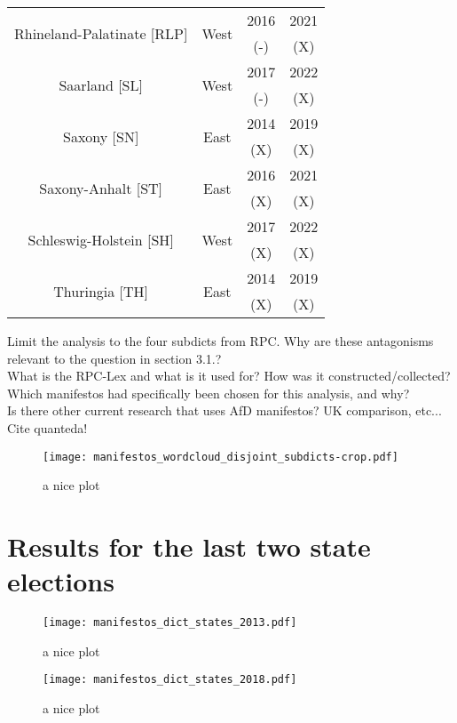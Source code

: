 \documentclass[a4paper]{scrreprt}
\begin{document}
\begin{table}
\begin{center}
\begin{tabular}{c c c c}
    \hline
    \multirow{2}{*}{Rhineland-Palatinate [RLP]} & \multirow{2}{*}{West} & 2016 & 2021 \\ && (-) & (X) \\
    \hline
    \multirow{2}{*}{Saarland [SL]} & \multirow{2}{*}{West} & 2017 & 2022 \\ && (-) & (X) \\
    \hline
    \multirow{2}{*}{Saxony [SN]} & \multirow{2}{*}{East} & 2014 & 2019 \\ && (X) & (X) \\
    \hline
    \multirow{2}{*}{Saxony-Anhalt [ST]} & \multirow{2}{*}{East} & 2016 & 2021 \\ && (X) & (X) \\
    \hline
    \multirow{2}{*}{Schleswig-Holstein [SH]} & \multirow{2}{*}{West} & 2017 & 2022 \\ && (X) & (X) \\
    \hline
    \multirow{2}{*}{Thuringia [TH]} & \multirow{2}{*}{East} & 2014 & 2019 \\ && (X) & (X) \\
    \hline
\end{tabular}\end{center}\end{table}
Limit the analysis to the four subdicts from RPC. Why are these antagonisms relevant to the question in section 3.1.?\\
What is the RPC-Lex and what is it used for? How was it constructed/collected?\\
Which manifestos had specifically been chosen for this analysis, and why?\\
Is there other current research that uses AfD manifestos? UK comparison, etc...\\
Cite quanteda!
\begin{figure}
    \centering
    \texttt{[image: manifestos\_wordcloud\_disjoint\_subdicts-crop.pdf]}
    \caption{a nice plot}
\end{figure}
\section{Results for the last two state elections}
\begin{figure}
    \centering
    \texttt{[image: manifestos\_dict\_states\_2013.pdf]}
    \caption{a nice plot}
\end{figure}
\begin{figure}
    \centering
    \texttt{[image: manifestos\_dict\_states\_2018.pdf]}
    \caption{a nice plot}
\end{figure}
\end{document}
